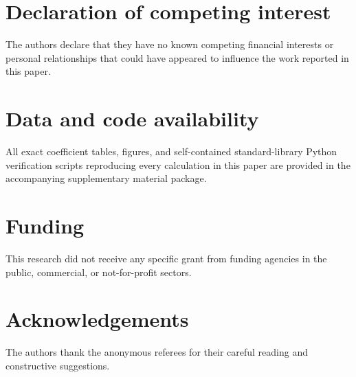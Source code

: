 \documentclass[preprint,12pt]{elsarticle}
\numberwithin{equation}{section}
\theoremstyle{plain}
\theoremstyle{definition}
\theoremstyle{remark}
\begin{document}
\section*{Declaration of competing interest}
The authors declare that they have no known competing financial interests or
personal relationships that could have appeared to influence the work reported in
this paper.

\section*{Data and code availability}
All exact coefficient tables, figures, and self-contained standard-library Python
verification scripts reproducing every calculation in this paper are provided in
the accompanying supplementary material package.

\section*{Funding}
This research did not receive any specific grant from funding agencies in the
public, commercial, or not-for-profit sectors.

\section*{Acknowledgements}
The authors thank the anonymous referees for their careful reading and constructive
suggestions.



\end{document}
